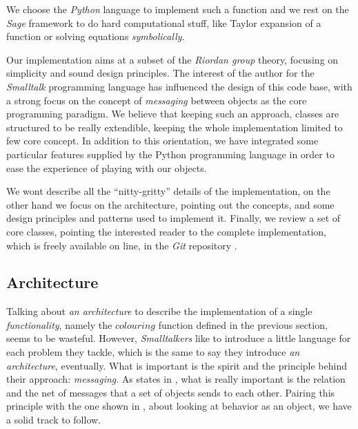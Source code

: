 We choose the \emph{Python} language to implement such a function and we rest
on the \emph{Sage} \cite{sage} framework to do hard computational stuff, like
Taylor expansion of a function or solving equations \emph{symbolically}.

Our implementation aims at a subset of the \emph{Riordan group} theory, focusing
on simplicity and sound design principles. The interest of the author for the
\emph{Smalltalk} programming language has influenced the design of this code
base, with a strong focus on the concept of \emph{messaging} between objects as
the core programming paradigm. We believe that keeping such an approach,
classes are structured to be really extendible, keeping the whole
implementation limited to few core concept. In addition to this orientation, we
have integrated some particular features supplied by the Python programming
language in order to ease the experience of playing with our objects.

We wont describe all the ``nitty-gritty'' details of the implementation, on the
other hand we focus on the architecture, pointing out the concepts, and some
design principles and patterns used to implement it. Finally, we review a set
of core classes, pointing the interested reader to the complete implementation,
which is freely available on line, in the \emph{Git} repository
\cite{nocentini:git:repository}.

\subsection{Architecture}

Talking about \emph{an architecture} to describe the implementation of a single
\emph{functionality}, namely the $colouring$ function defined in the previous
section, seems to be wasteful. However, \emph{Smalltalkers} like to introduce a
little language for each problem they tackle, which is the same to say they
introduce \emph{an architecture}, eventually. What is important is the spirit
and the principle behind their approach: \emph{messaging}. As
\citeauthor{kay:on:messaging} states in \cite{kay:on:messaging}, what is really
important is the relation and the net of messages that a set of objects sends
to each other. Pairing this principle with the one shown in
\cite{friedman:felleisen:few:java:few:patterns}, about looking at behavior as
an object, we have a solid track to follow.

